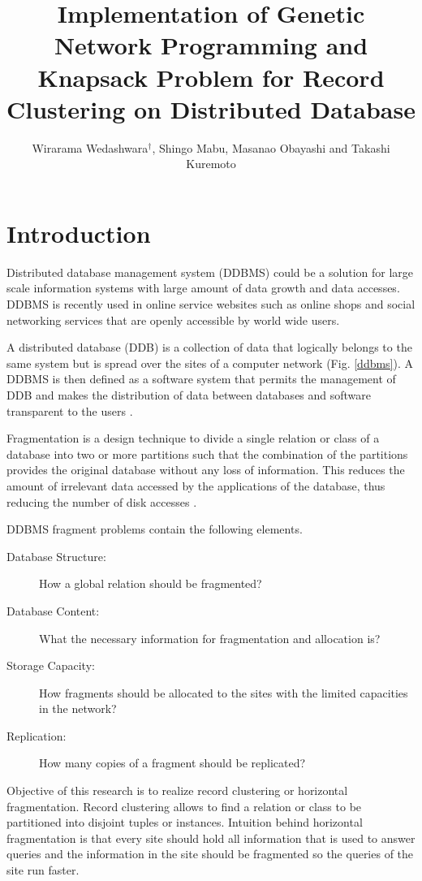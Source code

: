 \documentclass[fleqn,10pt,twocolumn]{SICE14}
\title{Implementation of Genetic Network Programming and Knapsack Problem for Record Clustering on Distributed Database }
\author{Wirarama Wedashwara${}^{\dagger}$, Shingo Mabu, Masanao Obayashi and Takashi Kuremoto}
\begin{document}
\maketitle


\section{Introduction}

Distributed database management system (DDBMS) could be a solution for large scale information systems with large amount of data growth and data accesses. DDBMS is recently used in online service websites such as online shops and social networking services that are openly accessible by world wide users.

A distributed database (DDB) is a collection of data that logically belongs to the same system but is spread over the sites of a computer network (Fig. \ref{ddbms}). A DDBMS is then defined as a software system that permits the management of DDB and makes the distribution of data between databases and software transparent to the users \cite{recordclustering}.

Fragmentation is a design technique to divide a single relation or class of a database into two or more partitions such that the combination of the partitions provides the original database without any loss of information. This reduces the amount of irrelevant data accessed by the applications of the database, thus reducing the number of disk accesses \cite{horizontalfragmentation,horizontalfragmentation2}.

DDBMS fragment problems contain the following elements.
\begin{description}
\item[Database Structure:] How a global relation should be fragmented?
\item[Database Content:] What the necessary information for fragmentation and allocation is?
\item[Storage Capacity:] How fragments should be allocated to the sites with the limited capacities in the network?
\item[Replication:] How many copies of a fragment should be replicated? 
\end{description}

Objective of this research is to realize record clustering or horizontal fragmentation. Record clustering allows to find a relation or class to be partitioned into disjoint tuples or instances. Intuition behind horizontal fragmentation is that every site should hold all information that is used to answer queries and the information in the site should be fragmented so the queries of the site run faster. 
\end{document}

